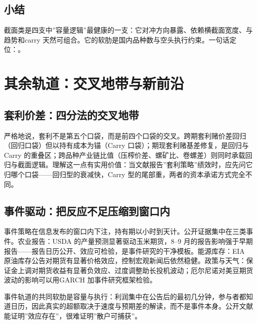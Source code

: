 \documentclass[12pt,a4paper]{ctexart}
\begin{document}
\subsection{小结}

截面类是四支中”\hspace{0.3em}容量逻辑”\hspace{0.3em}最健康的一支：它对冲方向暴露、依赖横截面宽度、与趋势和carry 天然可组合\cite{63, 65}。它的软肋是国内品种数与空头执行约束\cite{66}。一句话定位：。


\section{其余轨道：交叉地带与新前沿}

\subsection{套利价差：四分法的交叉地带}

严格地说，套利不是第五个口袋，而是前四个口袋的交叉。跨期套利赌价差回归（回归口袋）但以持有成本为锚（Carry 口袋）\cite{70, 71}；期现套利赌基差修复，是回归与Carry 的重叠区\cite{72}；跨品种产业链比值（压榨价差、螺矿比、卷螺差）则同时承载回归与截面逻辑\cite{40, 41, 68}。理解这一点有实用价值：当文献报告”\hspace{0.3em}套利策略”\hspace{0.3em}绩效时，应先问它归哪个口袋——回归型的衰减快\cite{35}，Carry 型的尾部重\cite{22}，两者的资本承诺方式完全不同。


\subsection{事件驱动：把反应不足压缩到窗口内}

事件策略在信息发布的窗口内下注，持有期以小时到天计。公开证据集中在三类事件。农业报告：USDA 的产量预测显著驱动玉米期货，8–9 月的报告影响强于早期报告\cite{73}——报告日历公开、效应可检验，是事件研究的干净模板。能源库存：EIA 原油库存公告对期货有显著价格效应，控制宏观新闻后依然稳健\cite{74}。政策与天气：保证金上调对期货收益有显著负效应、过度调整助长投机波动\cite{75}；厄尔尼诺对美豆期货波动的影响可以用GARCH 加事件研究框架检验\cite{76}。


事件轨道的共同软肋是容量与执行：利润集中在公告后的最初几分钟，参与者都知道日历，因此真实的超额取决于速度与预期差的解读，而不是事件本身。公开文献能证明”\hspace{0.3em}效应存在”，很难证明”\hspace{0.3em}散户可捕获”。
\end{document}

